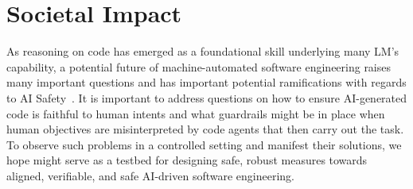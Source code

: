 \section{Societal Impact}
\label{appx:societal-impact}
As reasoning on code has emerged as a foundational skill underlying many LM's capability, a potential future of machine-automated software engineering raises many important questions and has important potential ramifications with regards to AI Safety~\citep{gros2023ai}.
It is important to address questions on how to ensure AI-generated code is faithful to human intents and what guardrails might be in place when human objectives are misinterpreted by code agents that then carry out the task.
To observe such problems in a controlled setting and manifest their solutions, we hope \benchmark{} might serve as a testbed for designing safe, robust measures 
towards aligned, verifiable, and safe AI-driven software engineering.